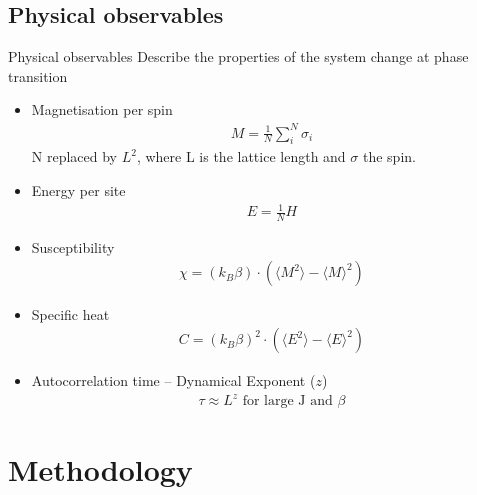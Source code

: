 \documentclass{beamer}
\begin{document}
\subsection{Physical observables}
\begin{frame}{Physical observables}
    Describe the properties of the system change at phase transition   
    \begin{itemize}
        \item Magnetisation per spin 
            \begin{align}
            M = \frac{1}{N}\sum_{i}^{N} \sigma_{i}
            \end{align}
            N replaced by $L^{2}$, where L is the lattice length and $\sigma$ the spin. \\
        \item Energy per site
            \begin{align}
            E = \frac{1}{N} H
            \end{align}
    \end{itemize}
\end{frame}

\begin{frame}
    \begin{itemize}
        \item Susceptibility
        \begin{align}
        \chi = (k_B \beta) \cdot (\langle M^2 \rangle-\langle M \rangle^2)
        \end{align}
        \item Specific heat
        \begin{align}
        C = (k_B \beta)^2 \cdot (\langle E^2 \rangle-\langle E \rangle^2) 
        \end{align}
        \item Autocorrelation time – Dynamical Exponent ($z$) \\
        \begin{align}
        \tau \approx L^z \text{ for large J and } \beta
        \end{align}
    \end{itemize}
\end{frame}


\section{Methodology}
\end{document}
